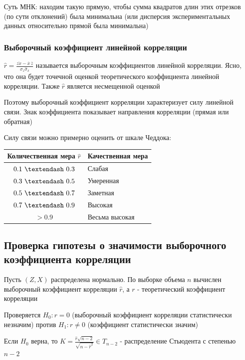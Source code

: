 \documentclass[12pt]{article}
\begin{document}
Суть МНК: находим такую прямую, чтобы сумма квадратов длин этих отрезков (по сути отклонений) была минимальна 
(или дисперсия экспериментальных данных относительно прямой была минимальна)


\subsubsection{Выборочный коэффициент линейной корреляции}

\Def $\hat r = \frac{\overline{z x} - \overline{x} \, \overline{z}}{\hat \sigma_z \hat \sigma_x}$ называется выборочным коэффициентов 
линейной корреляции. Ясно, что она будет точечной оценкой теоретического коэффициента линейной корреляции. 
Также $\hat r$ является несмещенной оценкой

Поэтому выборочный коэффициент корреляции характеризует силу линейной связи. Знак коэффициента показывает направления корреляции (прямая или обратная)

Силу связи можно примерно оценить от шкале Чеддока:

\smallvspace

\begin{tabular}{c|l}
    Количественная мера $\hat r$ & Качественная мера \\
    \hline
    $0.1 \ \textendash \ 0.3$ & Слабая \\
    $0.3 \ \textendash \ 0.5$ & Умеренная \\
    $0.5 \ \textendash \ 0.7$ & Заметная \\
    $0.7 \ \textendash \ 0.9$ & Высокая \\
    $> 0.9$ & Весьма высокая \\
\end{tabular}

\mediumvspace

\subsection{Проверка гипотезы о значимости выборочного коэффициента корреляции}

Пусть $(Z, X)$ распределена нормально. По выборке объема $n$ вычислен выборочный коэффициент корреляции $\hat r$, а $r$ - теоретический коэффициент корреляции

Проверяется $H_0 : r = 0$ (выборочный коэффициент корреляции статистически незначим) против $H_1 : r \neq 0$ (коэффициент статистически значим)

\begin{MyTheorem}
    Если $H_0$ верна, то $K = \frac{\hat r \sqrt{n - 2}}{\sqrt{n - \hat r^2}} \in T_{n - 2}$ - распределение Стьюдента с степенью $n - 2$ 
\end{MyTheorem}
\end{document}
